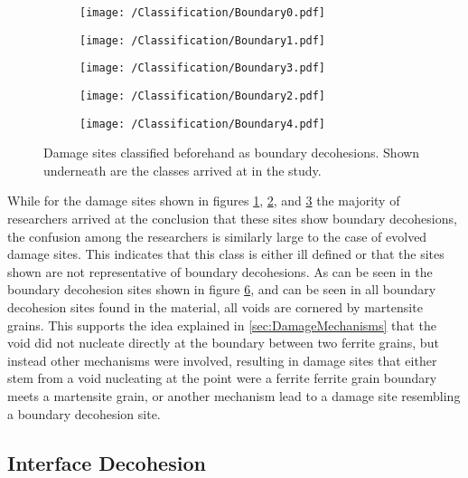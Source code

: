 \begin{figure}[H]
\begin{subfigure}{.2\textwidth}
\centering
  \texttt{[image: /Classification/Boundary0.pdf]}
  \caption{}
  \label{fig:BD1}
\end{subfigure}%
\begin{subfigure}{.2\textwidth}
\centering
  \texttt{[image: /Classification/Boundary1.pdf]}
  \caption{}
  \label{fig:BD2}
\end{subfigure}%
\centering
\begin{subfigure}{.2\textwidth}
\centering
  \texttt{[image: /Classification/Boundary3.pdf]}
  \caption{}
  \label{fig:BD3}
\end{subfigure}%
\begin{subfigure}{.2\textwidth}
\centering
  \texttt{[image: /Classification/Boundary2.pdf]}
  \caption{}
  \label{fig:BD4}
\end{subfigure}%
\begin{subfigure}{.2\textwidth}
\centering
  \texttt{[image: /Classification/Boundary4.pdf]}
  \caption{}
  \label{fig:BD5}
\end{subfigure}%
\caption{Damage sites classified beforehand as boundary decohesions. Shown underneath are the classes arrived at in the study.}
\label{fig:BD}
\end{figure}

While for the damage sites shown in figures \ref{fig:BD1}, \ref{fig:BD2}, and \ref{fig:BD3} the majority of researchers arrived at the conclusion that these sites show boundary decohesions, the confusion among the researchers is similarly large to the case of evolved damage sites. This indicates that this class is either ill defined or that the sites shown are not representative of boundary decohesions. As can be seen in the boundary decohesion sites shown in figure \ref{fig:BD}, and can be seen in all boundary decohesion sites found in the material, all voids are cornered by martensite grains. This supports the idea explained in \ref{sec:DamageMechanisms} that the void did not nucleate directly at the boundary between two ferrite grains, but instead other mechanisms were involved, resulting in damage sites that either stem from a void nucleating at the point were a ferrite ferrite grain boundary meets a martensite grain, or another mechanism lead to a damage site resembling a boundary decohesion site. 


\subsection{Interface Decohesion}


